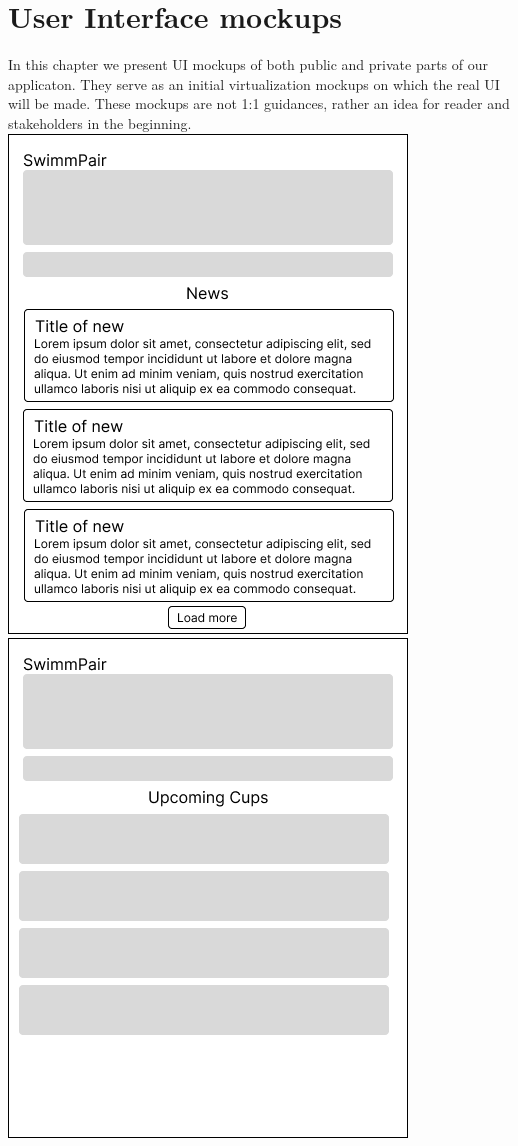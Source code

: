 \section{User Interface mockups}
In this chapter we present UI mockups of both public and private parts of our applicaton. They serve as an initial virtualization mockups on which the real UI will be made. These mockups are not 1:1 guidances, rather an idea for reader and stakeholders in the beginning.
\newline
\includegraphics[scale=0.507]{img/def-U-Main.png}
\includegraphics[scale=0.507]{img/def-U-ListingCups.png}
